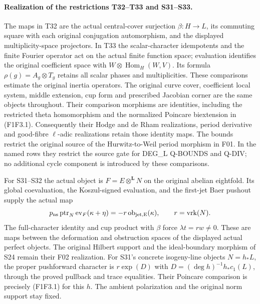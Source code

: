 \paragraph{Realization of the restrictions T32--T33 and S31--S33.}
The maps in T32 are the actual central-cover surjection
$\beta:H\to L$, its commuting square with each original
conjugation automorphism, and the displayed multiplicity-space
projectors. In T33 the scalar-character idempotents and the
finite Fourier operator act on the actual finite function space;
evaluation identifies the original coefficient space with
$W\otimes\operatorname{Hom}_H(W,V)$. Its formula
$\rho(g)=A_g\otimes T_g$ retains all scalar phases and
multiplicities. These comparisons estimate the original inertia
operators. The original curve cover, coefficient local system,
middle extension, cup form and prescribed Jacobian corner are
the same objects throughout. Their comparison morphisms are
identities, including the restricted theta homomorphism and
the normalized Poincare biextension in (F1F3.1).
Consequently their Hodge and de Rham realizations, period
derivative and good-fibre $\ell$-adic realizations retain those
identity maps. The bounds restrict the original source of the
Hurwitz-to-Weil period morphism in F01. In the named rows they
restrict the source gate for DEG\_L Q-BOUNDS and Q-DIV; no
additional cycle component is introduced by these comparisons.

For S31--S32 the actual object is
$F=E\otimes^{\mathbf L}N$ on the original abelian eightfold.
Its global coevaluation, the Koszul-signed evaluation, and
the first-jet Baer pushout supply the actual map
\[
 p_{\rm ns}\operatorname{ptr}_N
       \operatorname{ev}_F(\kappa+\eta)
       =-r\operatorname{ob}_{\rm jet,E}(\kappa),
 \qquad r=\operatorname{vrk}(N).
\]
The full-character identity and cup product with $\beta$ force
$\lambda t=rw\ne0$. These are maps between the deformation
and obstruction spaces of the displayed actual perfect objects.
The original Hilbert support and the ideal-boundary morphism
of S24 remain their F02 realization. For S31's concrete
isogeny-line objects $N=h_*L$, the proper pushforward character
is $r\exp(D)$ with
$D=(\deg h)^{-1}h_*c_1(L)$, through the proved pullback and
trace equalities. Their Poincare comparison is precisely
(F1F3.1) for this $h$. The ambient polarization and the
original norm support stay fixed.

